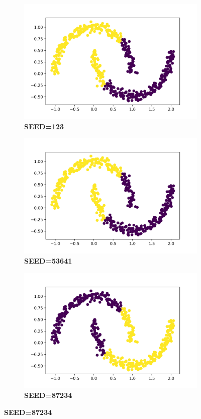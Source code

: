 \documentclass[11pt]{article}
\begin{document}
\begin{figure}[H]
    \begin{subfigure}{0.33\linewidth}
        \centering
        \includegraphics[width=1\linewidth]{d2_123.png}
        \caption{\textbf{SEED=123}}
    \end{subfigure}%
    \begin{subfigure}{0.33\linewidth}
        \centering
        \includegraphics[width=1\linewidth]{d2_53641.png}
        \caption{\textbf{SEED=53641}}
    \end{subfigure}%
    \begin{subfigure}{0.33\linewidth}
        \centering
        \includegraphics[width=1\linewidth]{d2_87234.png}
        \caption{\textbf{SEED=87234}}
    \end{subfigure}    
\end{figure}%
\end{document}
